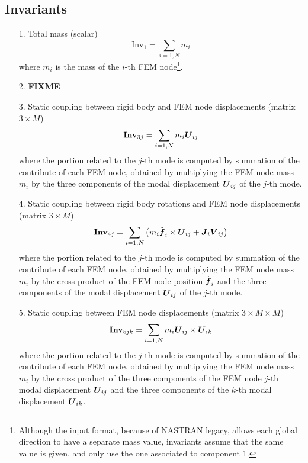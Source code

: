 \subsection{Invariants}
\begin{enumerate}
\item[1.] Total mass (scalar)
\begin{equation}
	\mathrm{Inv}_1 = \sum_{i=1,N} m_i
\end{equation}
where $m_i$ is the mass of the $i$-th FEM node\footnote{Although the input
format, because of NASTRAN legacy, allows each global direction to have
a separate mass value, invariants assume that the same value is given,
and only use the one associated to component 1.}.

\item[2.] \textbf{FIXME}

\item[3.] Static coupling between rigid body and FEM node displacements
(matrix $3\times{M}$)
\begin{equation}
	\boldsymbol{\mathrm{Inv}}_{3j} = \sum_{i=1,N} m_i \boldsymbol{U}_{ij}
\end{equation}
where the portion related to the $j$-th mode is computed by summation
of the contribute of each FEM node, obtained by multiplying the FEM node
mass $m_i$ by the three components of the modal displacement $\boldsymbol{U}_{ij}$
of the $j$-th mode.

\item[4.] Static coupling between rigid body rotations and FEM node 
displacements
(matrix $3\times{M}$)
\begin{equation}
	\boldsymbol{\mathrm{Inv}}_{4j} = \sum_{i=1,N} \left( 
		m_i \tilde{\boldsymbol{f}}_i \times \boldsymbol{U}_{ij}
		+ \boldsymbol{J}_i \boldsymbol{V}_{ij}
	 \right)
\end{equation}
where the portion related to the $j$-th mode is computed by summation
of the contribute of each FEM node, obtained by multiplying the FEM node
mass $m_i$ by the cross product of the FEM node position $\tilde{\boldsymbol{f}}_i$ 
and the three components of the modal displacement $\boldsymbol{U}_{ij}$ of the
$j$-th mode.

\item[5.] Static coupling between FEM node displacements
(matrix $3\times{M}\times{M}$)
\begin{equation}
	\boldsymbol{\mathrm{Inv}}_{5jk} = \sum_{i=1,N} m_i \boldsymbol{U}_{ij} \times \boldsymbol{U}_{ik}
\end{equation}
where the portion related to the $j$-th mode is computed by summation
of the contribute of each FEM node, obtained by multiplying the FEM node
mass $m_i$ by the cross product of the three components of the FEM node 
$j$-th modal displacement $\boldsymbol{U}_{ij}$ and the three components of the 
$k$-th modal displacement $\boldsymbol{U}_{ik}$.


\end{enumerate}
